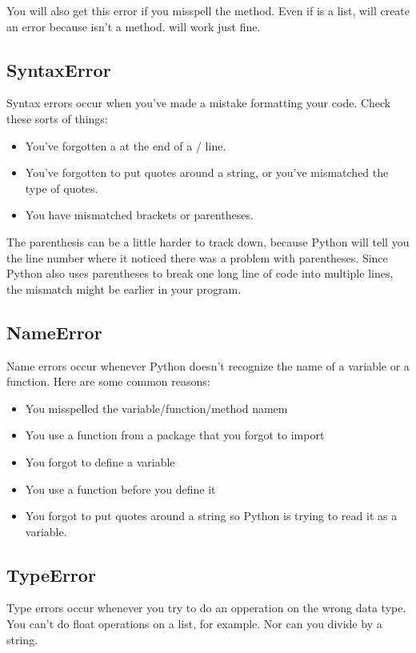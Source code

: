 You will also get this error if you misspell the method.  Even if  is a list,  will create an error because  isn't a method.   will work just fine.

\subsection*{SyntaxError}
Syntax errors occur when you've made a mistake formatting your code.  Check these sorts of things:
\begin{itemize}
\item You've forgotten a \code{:} at the end of a / line.
\item You've forgotten to put quotes around a string, or you've mismatched the type of quotes.
\item You have mismatched brackets or parentheses.
\end{itemize}
The parenthesis can be a little harder to track down, because Python will tell you the line number where it noticed there was a problem with parentheses.  Since Python also uses parentheses to break one long line of code into multiple lines, the mismatch might be earlier in your program.

\subsection*{NameError}
Name errors occur whenever Python doesn't recognize the name of a variable or a function.  Here are some common reasons:
\begin{itemize}
\item You misspelled the variable/function/method namem
\item You use a function from a package that you forgot to import
\item You forgot to define a variable
\item You use a function before you define it
\item You forgot to put quotes around a string so Python is trying to read it as a variable.
\end{itemize}

\subsection*{TypeError}
Type errors occur whenever you try to do an opperation on the wrong data type.  You can't do float operations on a list, for example.  Nor can you divide by a string.

